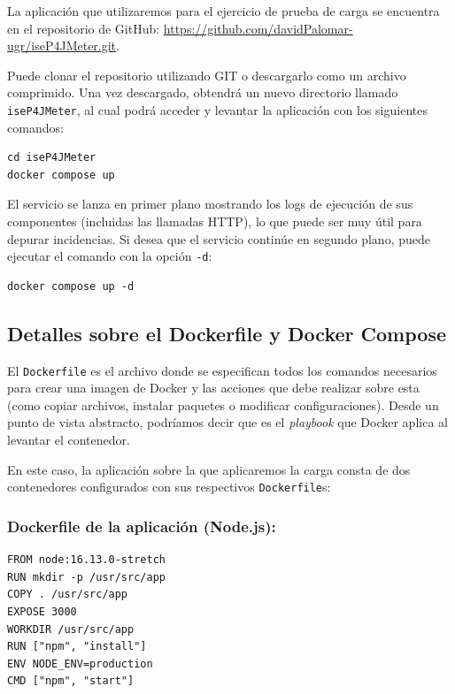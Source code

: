La aplicación que utilizaremos para el ejercicio de prueba de carga se encuentra en el repositorio de GitHub: \url{https://github.com/davidPalomar-ugr/iseP4JMeter.git}. 

Puede clonar el repositorio utilizando GIT o descargarlo como un archivo comprimido. Una vez descargado, obtendrá un nuevo directorio llamado \texttt{iseP4JMeter}, al cual podrá acceder y levantar la aplicación con los siguientes comandos:

\begin{verbatim}
cd iseP4JMeter
docker compose up
\end{verbatim}

El servicio se lanza en primer plano mostrando los logs de ejecución de sus componentes (incluidas las llamadas HTTP), lo que puede ser muy útil para depurar incidencias. Si desea que el servicio continúe en segundo plano, puede ejecutar el comando con la opción \texttt{-d}:

\begin{verbatim}
docker compose up -d
\end{verbatim}

\subsection*{Detalles sobre el Dockerfile y Docker Compose}

El \texttt{Dockerfile} es el archivo donde se especifican todos los comandos necesarios para crear una imagen de Docker y las acciones que debe realizar sobre esta (como copiar archivos, instalar paquetes o modificar configuraciones). Desde un punto de vista abstracto, podríamos decir que es el \textit{playbook} que Docker aplica al levantar el contenedor.

En este caso, la aplicación sobre la que aplicaremos la carga consta de dos contenedores configurados con sus respectivos \texttt{Dockerfile}s:

\subsubsection*{Dockerfile de la aplicación (Node.js):}

\begin{verbatim}
FROM node:16.13.0-stretch
RUN mkdir -p /usr/src/app
COPY . /usr/src/app
EXPOSE 3000
WORKDIR /usr/src/app
RUN ["npm", "install"]
ENV NODE_ENV=production
CMD ["npm", "start"]
\end{verbatim}

